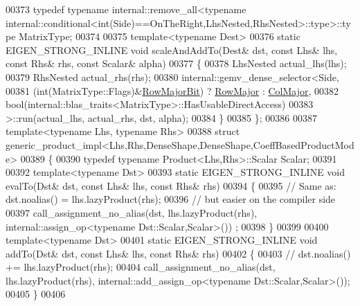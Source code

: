 \begin{DoxyCode}
00373   \textcolor{keyword}{typedef} \textcolor{keyword}{typename} internal::remove\_all<typename
       internal::conditional<int(Side)==OnTheRight,LhsNested,RhsNested>::type>::type MatrixType;
00374 
00375   \textcolor{keyword}{template}<\textcolor{keyword}{typename} Dest>
00376   \textcolor{keyword}{static} EIGEN\_STRONG\_INLINE \textcolor{keywordtype}{void} scaleAndAddTo(Dest& dst, \textcolor{keyword}{const} Lhs& lhs, \textcolor{keyword}{const} Rhs& rhs, \textcolor{keyword}{const} Scalar& 
      alpha)
00377   \{
00378     LhsNested actual\_lhs(lhs);
00379     RhsNested actual\_rhs(rhs);
00380     internal::gemv\_dense\_selector<Side,
00381                             (int(MatrixType::Flags)&\hyperlink{group__flags_gae4f56c2a60bbe4bd2e44c5b19cbe8762}{RowMajorBit}) ? 
      \hyperlink{group__enums_ggaacded1a18ae58b0f554751f6cdf9eb13acfcde9cd8677c5f7caf6bd603666aae3}{RowMajor} : \hyperlink{group__enums_ggaacded1a18ae58b0f554751f6cdf9eb13a0cbd4bdd0abcfc0224c5fcb5e4f6669a}{ColMajor},
00382                             \textcolor{keywordtype}{bool}(internal::blas\_traits<MatrixType>::HasUsableDirectAccess)
00383                            >::run(actual\_lhs, actual\_rhs, dst, alpha);
00384   \}
00385 \};
00386 
00387 \textcolor{keyword}{template}<\textcolor{keyword}{typename} Lhs, \textcolor{keyword}{typename} Rhs>
00388 \textcolor{keyword}{struct }generic\_product\_impl<Lhs,Rhs,DenseShape,DenseShape,CoeffBasedProductMode> 
00389 \{
00390   \textcolor{keyword}{typedef} \textcolor{keyword}{typename} Product<Lhs,Rhs>::Scalar Scalar;
00391   
00392   \textcolor{keyword}{template}<\textcolor{keyword}{typename} Dst>
00393   \textcolor{keyword}{static} EIGEN\_STRONG\_INLINE \textcolor{keywordtype}{void} evalTo(Dst& dst, \textcolor{keyword}{const} Lhs& lhs, \textcolor{keyword}{const} Rhs& rhs)
00394   \{
00395     \textcolor{comment}{// Same as: dst.noalias() = lhs.lazyProduct(rhs);}
00396     \textcolor{comment}{// but easier on the compiler side}
00397     call\_assignment\_no\_alias(dst, lhs.lazyProduct(rhs), internal::assign\_op<typename Dst::Scalar,Scalar>())
      ;
00398   \}
00399   
00400   \textcolor{keyword}{template}<\textcolor{keyword}{typename} Dst>
00401   \textcolor{keyword}{static} EIGEN\_STRONG\_INLINE \textcolor{keywordtype}{void} addTo(Dst& dst, \textcolor{keyword}{const} Lhs& lhs, \textcolor{keyword}{const} Rhs& rhs)
00402   \{
00403     \textcolor{comment}{// dst.noalias() += lhs.lazyProduct(rhs);}
00404     call\_assignment\_no\_alias(dst, lhs.lazyProduct(rhs), internal::add\_assign\_op<typename
       Dst::Scalar,Scalar>());
00405   \}
00406   

\end{DoxyCode}

